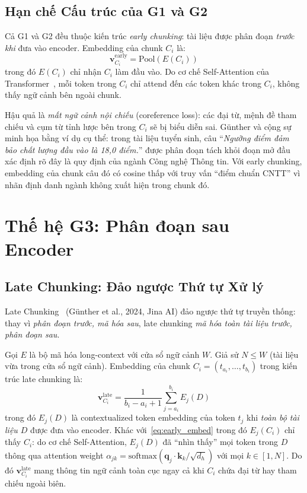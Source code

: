 \documentclass[12pt,a4paper]{report}
\theoremstyle{plain}
\theoremstyle{definition}
\begin{document}
	\subsection{Hạn chế Cấu trúc của G1 và G2}
	\label{subsec:early_chunking_limit}
	
	Cả G1 và G2 đều thuộc kiến trúc \emph{early chunking}: tài liệu được phân
	đoạn \emph{trước khi} đưa vào encoder. Embedding của chunk $C_i$ là:
	\begin{equation}
		\mathbf{v}_{C_i}^{\text{early}} = \text{Pool}\!\left(E(C_i)\right)
		\label{eq:early_embed}
	\end{equation}
	trong đó $E(C_i)$ chỉ nhận $C_i$ làm đầu vào. Do cơ chế Self-Attention
	của Transformer~\cite{vaswani2017attention}, mỗi token trong $C_i$ chỉ
	attend đến các token khác trong $C_i$, không thấy ngữ cảnh bên ngoài chunk.
	
	Hậu quả là \emph{mất ngữ cảnh nội chiếu} (coreference loss): các đại từ,
	mệnh đề tham chiếu và cụm từ tỉnh lược bên trong $C_i$ sẽ bị biểu diễn
	sai. Günther và cộng sự~\cite{gunther2024late} minh họa bằng ví dụ cụ thể:
	trong tài liệu tuyển sinh, câu ``\textit{Ngưỡng điểm đảm bảo chất lượng
		đầu vào là 18,0 điểm.}'' được phân đoạn tách khỏi đoạn mở đầu xác định
	rõ đây là quy định của ngành Công nghệ Thông tin. Với early chunking,
	embedding của chunk câu đó có cosine thấp với truy vấn ``điểm chuẩn CNTT''
	vì nhãn định danh ngành không xuất hiện trong chunk đó.
	
	\section{Thế hệ G3: Phân đoạn sau Encoder}
	\label{sec:g3}
	
	\subsection{Late Chunking: Đảo ngược Thứ tự Xử lý}
	\label{subsec:late_chunking}
	
	Late Chunking~\cite{gunther2024late} (Günther et al., 2024, Jina AI) đảo
	ngược thứ tự truyền thống: thay vì \emph{phân đoạn trước, mã hóa sau},
	late chunking \emph{mã hóa toàn tài liệu trước, phân đoạn sau}.
	
	Gọi $E$ là bộ mã hóa long-context với cửa sổ ngữ cảnh $W$. Giả sử
	$N \leq W$ (tài liệu vừa trong cửa sổ ngữ cảnh). Embedding của chunk
	$C_i = (t_{a_i}, \ldots, t_{b_i})$ trong kiến trúc late chunking là:
	\begin{equation}
		\mathbf{v}_{C_i}^{\text{late}}
		= \frac{1}{b_i - a_i + 1} \sum_{j=a_i}^{b_i} E_j(D)
		\label{eq:late_embed}
	\end{equation}
	trong đó $E_j(D)$ là contextualized token embedding của token $t_j$ khi
	\emph{toàn bộ tài liệu $D$} được đưa vào encoder. Khác với~\eqref{eq:early_embed}
	trong đó $E_j(C_i)$ chỉ thấy $C_i$: do cơ chế Self-Attention, $E_j(D)$
	đã ``nhìn thấy'' mọi token trong $D$ thông qua attention weight
	$\alpha_{jk} = \text{softmax}(\mathbf{q}_j \cdot \mathbf{k}_k / \sqrt{d_h})$
	với mọi $k \in [1, N]$. Do đó $\mathbf{v}_{C_i}^{\text{late}}$ mang thông
	tin ngữ cảnh toàn cục ngay cả khi $C_i$ chứa đại từ hay tham chiếu ngoài biên.
	
\end{document}
